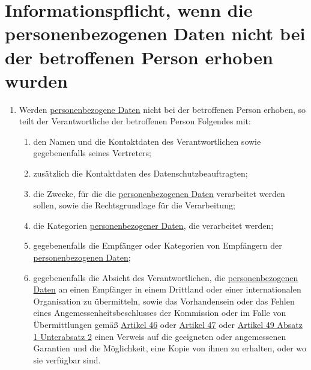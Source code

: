 \chapter{Informationspflicht, wenn die personenbezogenen Daten nicht bei der betroffenen Person erhoben wurden}
\label{ch:14}


\begin{enumerate}

  \item Werden \hyperref[itm:04-1]{personenbezogene Daten} nicht bei der betroffenen Person erhoben, so teilt der Verantwortliche der
   betroffenen Person Folgendes mit:
  \label{itm:14-1}

  \begin{enumerate}
  
    \item den Namen und die Kontaktdaten des Verantwortlichen sowie gegebenenfalls seines Vertreters;
    \label{itm:14-1a}

    \item zusätzlich die Kontaktdaten des Datenschutzbeauftragten;
    \label{itm:14-1b}

    \item die Zwecke, für die die \hyperref[itm:04-1]{personenbezogenen Daten} verarbeitet werden sollen, sowie die Rechtsgrundlage für die
     Verarbeitung;
    \label{itm:14-1c}

    \item die Kategorien \hyperref[itm:04-1]{personenbezogener Daten}, die verarbeitet werden;
    \label{itm:14-1d}

    \item gegebenenfalls die Empfänger oder Kategorien von Empfängern der \hyperref[itm:04-1]{personenbezogenen Daten};
    \label{itm:14-1e}

    \item gegebenenfalls die Absicht des Verantwortlichen, die \hyperref[itm:04-1]{personenbezogenen Daten} an einen Empfänger in einem
     Drittland oder einer internationalen Organisation zu übermitteln, sowie das Vorhandensein oder das Fehlen eines
     Angemessenheitsbeschlusses der Kommission oder im Falle von Übermittlungen gemäß \hyperref[ch:46]{Artikel 46} oder
     \hyperref[ch:47]{Artikel 47} oder \hyperref[itm:49-1-2]{Artikel 49 Absatz 1 Unterabsatz 2} einen Verweis auf die
      geeigneten oder angemessenen Garantien und die Möglichkeit, eine Kopie von ihnen zu erhalten, oder wo sie
      verfügbar sind.
    \label{itm:14-1f}


\end{enumerate}
\end{enumerate}
